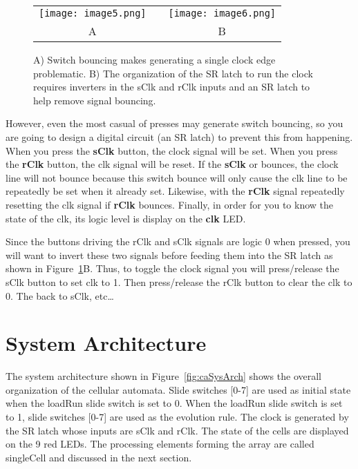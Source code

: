 \begin{figure}[ht]
    \begin{tabular}{ccc }
        \texttt{[image: image5.png]} &  & \texttt{[image: image6.png]} \\
        A  & & B \\
    \end{tabular}
    \caption{A) Switch bouncing makes generating a single clock edge problematic.
B) The organization of the SR latch to run the clock requires
inverters in the sClk and rClk inputs and an SR latch to help remove
signal bouncing.}
\label{fig:caSwitchBounce}
\end{figure}

However, even the most casual of presses may generate switch bouncing,
so you are going to design a digital circuit (an SR latch) to prevent
this from happening. When you press the \textbf{sClk} button, the clock
signal will be set. When you press the \textbf{rClk} button, the clk
signal will be reset. If the \textbf{sClk} or bounces, the clock line
will not bounce because this switch bounce will only cause the clk line
to be repeatedly be set when it already set. Likewise, with the
\textbf{rClk} signal repeatedly resetting the clk signal if
\textbf{rClk} bounces. Finally, in order for you to know the state of
the clk, its logic level is display on the \textbf{clk} LED.

Since the buttons driving the rClk and sClk signals are logic 0 when
pressed, you will want to invert these two signals before feeding them
into the SR latch as shown in Figure~\ref{fig:caSwitchBounce}B. Thus, to
toggle the clock signal
you will press/release the sClk button to set clk to 1. Then
press/release the rClk button to clear the clk to 0. The back to sClk,
etc\ldots{}

\section{System Architecture}

The system architecture shown in Figure~\ref{fig:caSysArch} shows the overall organization
of the cellular automata. Slide switches {[}0-7{]} are used as initial
state when the loadRun slide switch is set to 0. When the loadRun slide
switch is set to 1, slide switches {[}0-7{]} are used as the evolution
rule. The clock is generated by the SR latch whose inputs are sClk and
rClk. The state of the cells are displayed on the 9 red LEDs. The
processing elements forming the array are called singleCell and
discussed in the next section.


